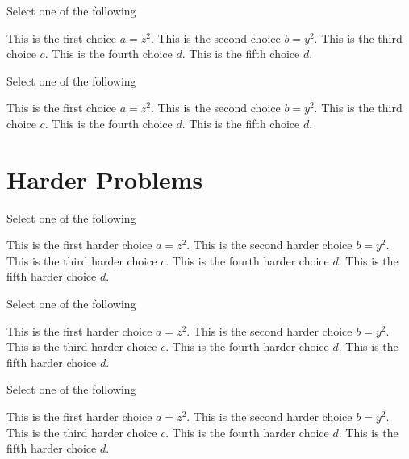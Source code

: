 \begin{problem}[Pickone II]
Select one of the following
\begin{pickone}[20]
\choice This is the first choice $a = z^2$.
\choice This is the second choice $b = y^2$.
\correctchoice This is the third choice $c$.
\correctchoice This is the fourth choice $d$.
\choice This is the fifth choice $d$.
\end{pickone}
\end{problem}

\begin{problem}
Select one of the following
\begin{pickone}[30]
\choice This is the first choice $a = z^2$.
\choice This is the second choice $b = y^2$.
\correctchoice This is the third choice $c$.
\correctchoice This is the fourth choice $d$.
\choice This is the fifth choice $d$.
\end{pickone}
\end{problem}


\section{Harder Problems}

\begin{problem}
Select one of the following
\begin{pickone}[40]
\choice This is the first harder choice $a = z^2$.
\choice This is the second harder choice $b = y^2$.
\correctchoice This is the third harder choice $c$.
\correctchoice This is the fourth harder choice $d$.
\choice This is the fifth harder choice $d$.
\end{pickone}
\end{problem}


\begin{problem}
Select one of the following
\begin{pickone}[50]
\choice This is the first harder choice $a = z^2$.
\choice This is the second harder choice $b = y^2$.
\correctchoice This is the third harder choice $c$.
\correctchoice This is the fourth harder choice $d$.
\choice This is the fifth harder choice $d$.
\end{pickone}
\end{problem}

\begin{problem}
Select one of the following
\begin{pickone}[60]
\choice This is the first harder choice $a = z^2$.
\choice This is the second harder choice $b = y^2$.
\correctchoice This is the third harder choice $c$.
\correctchoice This is the fourth harder choice $d$.
\choice This is the fifth harder choice $d$.
\end{pickone}
\end{problem}


